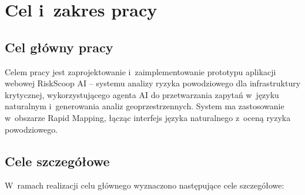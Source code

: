 \section*{Cel i~zakres pracy}
\label{chap:cel}

\subsection*{Cel główny pracy}

Celem pracy jest zaprojektowanie i~zaimplementowanie prototypu aplikacji webowej RiskScoop AI -- systemu analizy ryzyka powodziowego dla infrastruktury krytycznej, wykorzystującego agenta AI do przetwarzania zapytań w~języku naturalnym i~generowania analiz geoprzestrzennych. System ma zastosowanie w~obszarze Rapid Mapping, łącząc interfejs języka naturalnego z~oceną ryzyka powodziowego.

\subsection*{Cele szczegółowe}

W~ramach realizacji celu głównego wyznaczono następujące cele szczegółowe:

